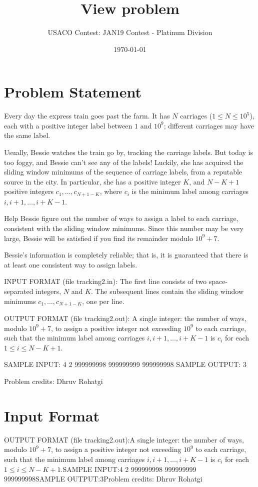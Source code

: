 \documentclass[12pt]{article}
\title{View problem}
\author{USACO Contest: JAN19 Contest - Platinum Division}
\date{\today}
\begin{document}
\maketitle

\section*{Problem Statement}

Every day the express train goes past the farm. It has $N$ carriages
($1 \leq N \leq 10^5$), each with a positive integer label between $1$ and
$10^9$; different carriages may have the same label.

Usually, Bessie watches the train go by, tracking the carriage labels. But today
is too foggy, and Bessie can't see any of the labels! Luckily, she has acquired
the sliding window minimums of the sequence of carriage labels, from a reputable
source in the city. In particular, she has a positive integer $K$, and $N-K+1$
positive integers $c_1,\dots,c_{N+1-K}$, where $c_i$ is the minimum label among
carriages $i, i+1, \dots, i+K-1$.

Help Bessie figure out the number of ways to assign a label to each carriage,
consistent with the sliding window minimums. Since this number may be very
large, Bessie will be satisfied if you find its remainder modulo $10^9 + 7$.

Bessie's information is completely reliable; that is, it is guaranteed that
there is at least one consistent way to assign labels.

INPUT FORMAT (file tracking2.in):
The first line consists of two space-separated integers, $N$ and $K$. The
subsequent lines contain the sliding window minimums $c_1,\dots,c_{N+1-K}$, one
per line.

OUTPUT FORMAT (file tracking2.out):
A single integer: the number of ways, modulo $10^9 + 7$, to assign a positive
integer not exceeding $10^9$ to each carriage, such that the minimum label among
carriages $i, i+1, \dots, i+K-1$ is $c_i$ for each $1 \leq i \leq N-K+1$.

SAMPLE INPUT:
4 2
999999998
999999999
999999998
SAMPLE OUTPUT: 
3


Problem credits: Dhruv Rohatgi



\section*{Input Format}
OUTPUT FORMAT (file tracking2.out):A single integer: the number of ways, modulo $10^9 + 7$, to assign a positive
integer not exceeding $10^9$ to each carriage, such that the minimum label among
carriages $i, i+1, \dots, i+K-1$ is $c_i$ for each $1 \leq i \leq N-K+1$.SAMPLE INPUT:4 2
999999998
999999999
999999998SAMPLE OUTPUT:3Problem credits: Dhruv Rohatgi
\end{document}
